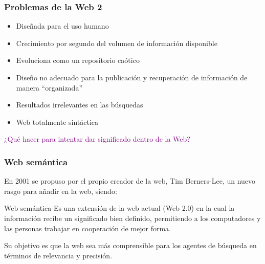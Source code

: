 \documentclass[
10pt, %
aspectratio=169, %
]{beamer}
\begin{document}
	\begin{frame}
		
		\frametitle{Problemas de la Web 2}
		
		\begin{itemize}
			\item Diseñada para el uso humano
			\item Crecimiento por segundo del volumen de información disponible
			\item Evoluciona como un repositorio caótico
			\item Diseño no adecuado para la publicación y recuperación de información de manera ``organizada''
			\item Resultados irrelevantes en las búsquedas
			\item Web totalmente sintáctica
		\end{itemize}
		
		\vspace{2\baselineskip}
		\pause
		\textcolor{purple}{
			¿Qué hacer para intentar dar significado dentro de la Web?
		}
		
	\end{frame}
	
	\begin{frame}
		
		\frametitle{Web semántica}
		
		En 2001 se propuso por el propio creador de la web, Tim Berners-Lee, un nuevo rasgo para añadir en la web, siendo: 
		
		\begin{alertblock}{Web semántica}
			Es una extensión de la web actual (Web 2.0) en la cual la información recibe un significado bien definido, permitiendo a los computadores y las personas trabajar en cooperación de mejor forma.
		\end{alertblock}
		
		
		\vspace{2\baselineskip}
		Su objetivo es que la web sea más comprensible para los agentes de búsqueda en términos de relevancia y precisión.
		
	\end{frame}
	
\end{document}
